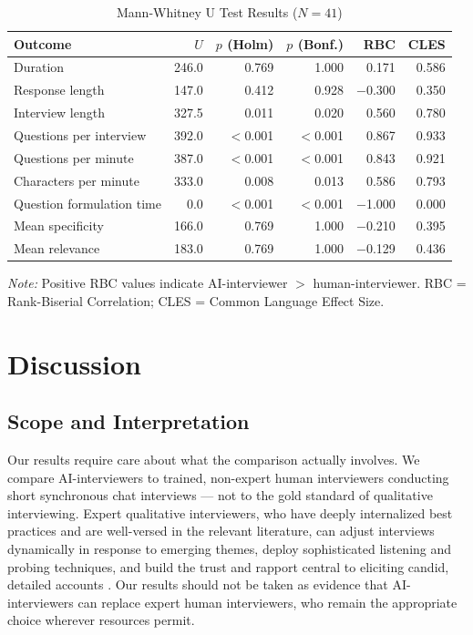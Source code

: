 \documentclass[12pt]{article}
\newcommand{\AII}{AI-interviewer}
\newcommand{\AIIs}{AI-interviewers}
\begin{document}
\begin{table}[H]
\centering
\caption{Mann-Whitney U Test Results ($N = 41$)}
\label{tab:mwu}
\begin{tabularx}{\textwidth}{Xrrrrr}
\toprule
\textbf{Outcome} & \textbf{$U$} & \textbf{$p$ (Holm)} &
  \textbf{$p$ (Bonf.)} & \textbf{RBC} & \textbf{CLES} \\
\midrule
Duration                  & 246.0 & 0.769    & 1.000    &    0.171 & 0.586 \\
Response length           & 147.0 & 0.412    & 0.928    & $-$0.300 & 0.350 \\
Interview length          & 327.5 & 0.011    & 0.020    &    0.560 & 0.780 \\
Questions per interview   & 392.0 & $<$0.001 & $<$0.001 &    0.867 & 0.933 \\
Questions per minute      & 387.0 & $<$0.001 & $<$0.001 &    0.843 & 0.921 \\
Characters per minute     & 333.0 & 0.008    & 0.013    &    0.586 & 0.793 \\
Question formulation time &   0.0 & $<$0.001 & $<$0.001 & $-$1.000 & 0.000 \\
Mean specificity          & 166.0 & 0.769    & 1.000    & $-$0.210 & 0.395 \\
Mean relevance            & 183.0 & 0.769    & 1.000    & $-$0.129 & 0.436 \\
\bottomrule
\end{tabularx}
\smallskip
\parbox{\textwidth}{\singlespacing\small \textit{Note:} Positive RBC values indicate \AII{} $>$ human-interviewer. RBC = Rank-Biserial Correlation; CLES = Common Language Effect Size.}
\end{table}


\section*{Discussion}

\subsection*{Scope and Interpretation}

Our results require care about what the comparison actually involves. We compare \AIIs{} to trained, non-expert human interviewers conducting short synchronous chat interviews --- not to the gold standard of qualitative interviewing. Expert qualitative interviewers, who have deeply internalized best practices and are well-versed in the relevant literature, can adjust interviews dynamically in response to emerging themes, deploy sophisticated listening and probing techniques, and build the trust and rapport central to eliciting candid, detailed accounts \citep{Weiss1995, SmallCalarco2022}. Our results should not be taken as evidence that \AIIs{} can replace expert human interviewers, who remain the appropriate choice wherever resources permit.
\end{document}

